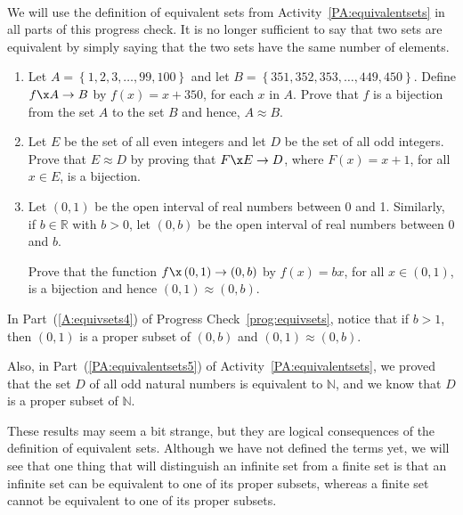 \begin{prog}\label{prog:equivsets} \hfill \\
We will use the definition of equivalent sets from \typeu Activity~\ref*{PA:equivalentsets} in all parts of this progress check.  It is no longer sufficient to say that two sets are equivalent by simply saying that the two sets have the same number of elements.

\begin{enumerate}
  \item Let $A = \left\{ 1, 2, 3, \ldots, 99, 100 \right\}$ and let 
$B = \left\{ 351, 352, 353, \ldots, 449, 450 \right\}$.  Define $f\x A \to B$ by $f(x) = x + 350$, for each $x$ in $A$.  Prove that $f$ is a bijection from the set $A$ to the set $B$ and hence, $A \approx B$.

\item Let $E$ be the set of all even integers and let $D$ be the set of all odd integers.  Prove that $E \approx D$ by proving that $F\x E \to D$, where $F \left( x \right) = x + 1$, for all $x \in E$, is a bijection.

\item Let $\left( 0, 1 \right)$ be the open interval of real numbers between 0 and 1.  Similarly, if $b \in \mathbb{R}$ with $b > 0$, let $\left( 0, b \right)$ be the open interval of real numbers between 0 and $b$. \label{A:equivsets4}

Prove that the function $f\x \left( 0, 1 \right) \to \left( 0, b \right)$ by $f \left( x \right) = bx$, for all 
$x \in \left( 0, 1 \right)$, is a bijection and hence 
$\left( 0, 1 \right) \approx \left( 0, b \right)$.
\end{enumerate}
\end{prog}
\hbreak
%
In Part~(\ref{A:equivsets4}) of Progress Check~\ref{prog:equivsets}, notice that if $b > 1$, then 
$\left( 0, 1 \right)$ is a proper subset of $\left( 0, b \right)$ and 
$\left( 0, 1 \right) \approx \left( 0, b \right)$.

Also, in Part~(\ref{PA:equivalentsets5}) of \typeu Activity~\ref*{PA:equivalentsets}, we proved that the set $D$ of all odd natural numbers is equivalent to $\mathbb{N}$, and we know that $D$ is a proper subset of $\mathbb{N}$.  

These results may seem a bit strange, but they are logical consequences of the definition of equivalent sets.  Although we have not defined the terms yet, we will see that one thing that will distinguish an infinite set from a finite set is that an infinite set can be equivalent to one of its proper subsets, whereas a finite set cannot be equivalent to one of its proper subsets.  

\endinput
